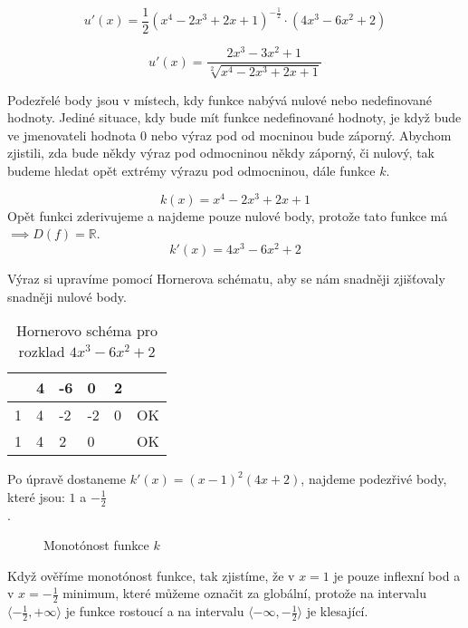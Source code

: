 \begin{displaymath}
u'(x)=\frac{1}{2}(x^4 -2x^3 + 2x + 1)^{-\frac{1}{2}}\cdot(4x^3 - 6x^2 + 2)
\end{displaymath}

\begin{displaymath}
u'(x)=\frac{2x^3 - 3x^2 + 1}{\sqrt[2]{x^4 -2x^3 + 2x + 1}}
\end{displaymath}

Podezřelé body jsou v místech, kdy funkce nabývá nulové nebo nedefinované hodnoty. 
Jediné situace, kdy bude mít funkce nedefinované hodnoty, je když bude ve jmenovateli hodnota 0 nebo výraz pod od mocninou bude záporný.
Abychom zjistili, zda bude někdy výraz pod odmocninou někdy záporný, či nulový, tak budeme hledat opět extrémy výrazu pod odmocninou, dále funkce \(k\).

\begin{displaymath}
k(x)=x^4 -2x^3 + 2x + 1
\end{displaymath}
Opět funkci zderivujeme a najdeme pouze nulové body, protože tato funkce má \(\implies D(f) = \mathbb{R}\).
\begin{displaymath}
k'(x)=4x^3 -6x^2 + 2
\end{displaymath}

Výraz si upravíme pomocí Hornerova schématu, aby se nám snadněji zjišťovaly snadněji nulové body.
\begin{table}[!h]
\centering
\begin{tabular}{l||l|l|l|l|l}
	 & 4 & -6 &  0 & 2 &    \\ \hline\hline
   1 & 4 & -2 & -2 & 0 & OK \\ \hline
   1 & 4 &  2 &  0 &   & OK \\
\end{tabular}
\caption{Hornerovo schéma pro rozklad $4x^3 - 6x^2 + 2$}
\end{table}

Po úpravě dostaneme \(k'(x)=(x-1)^2(4x + 2)\), najdeme podezřivé body, které jsou: $1$ a $-\frac{1}{2}$\\.

\begin{figure}[H]
	\centering
	
	\caption{Monotónost funkce \(k\)}
\end{figure}

Když ověříme monotónost funkce, tak zjistíme, že v $x=1$ je pouze inflexní bod a v $x=-\frac{1}{2}$ minimum, 
které můžeme označit za globální, protože na intervalu \(\langle-\frac{1}{2},+\infty\rangle\) je funkce rostoucí 
a na intervalu \(\langle-\infty,-\frac{1}{2}\rangle\) je klesající.


